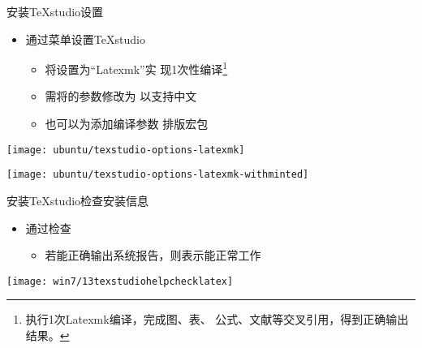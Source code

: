 \documentclass[fontset = none, t]{ctexbeamer}
\begin{document}
\begin{frame}{安装TeXstudio}{设置}
  \begin{spacing}{1.5}
    \begin{itemize}
    \item 通过菜单设置TeXstudio%
      \begin{itemize}
      \item 将设置为\alert{\enquote{Latexmk}}实
        现1次性编译\footnote[frame,2]{执行1次Latexmk编译，完成图、表、
          公式、文献等交叉引用，得到正确输出结果。}
      \item 需将的参数修改为
        以支持中文
      \item 也可以为添加编译参数
        排版宏包
      \end{itemize}
    \end{itemize}
    \begin{center}
      \begin{annotatedFigure}
        {\texttt{[image: ubuntu/texstudio-options-latexmk]}}
      \end{annotatedFigure}
      \begin{annotatedFigure}
        {\texttt{[image: ubuntu/texstudio-options-latexmk-withminted]}}
      \end{annotatedFigure}
    \end{center}
  \end{spacing}
\end{frame}

\begin{frame}{安装TeXstudio}{检查\tl 安装信息}
  \begin{spacing}{1.2}
    \begin{itemize}
    \item 通过检查%
      \begin{itemize}
      \item 若能正确输出\alert{系统报告}，则表示\tl 能正常工作
      \end{itemize}
    \end{itemize}
    \begin{center}
      \texttt{[image: win7/13texstudiohelpchecklatex]}\\
    \end{center}
  \end{spacing}
\end{frame}
\end{document}
